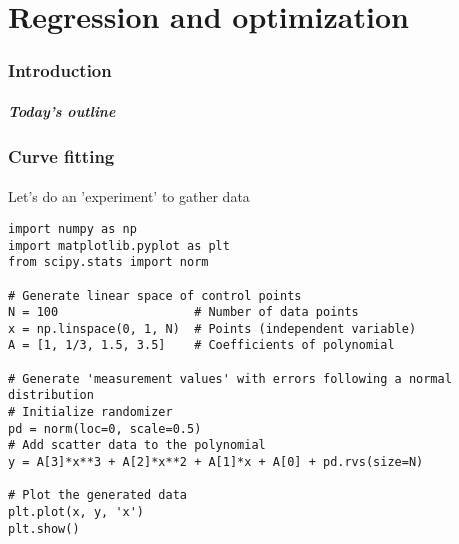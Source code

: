 \part{Regression and optimization}
\section{Introduction}
\subsection*{}
\begin{frame}[label=contents_opt]
  \frametitle{Today's outline}
\end{frame}


\section{Curve fitting}
\subsection*{}
\begin{frame}[fragile,label={slidedatacreate}]{Let's do an 'experiment' to gather data}
    \begin{lstlisting}[basicstyle=\scriptsize]
import numpy as np
import matplotlib.pyplot as plt
from scipy.stats import norm

# Generate linear space of control points
N = 100                   # Number of data points
x = np.linspace(0, 1, N)  # Points (independent variable)
A = [1, 1/3, 1.5, 3.5]    # Coefficients of polynomial

# Generate 'measurement values' with errors following a normal distribution
# Initialize randomizer
pd = norm(loc=0, scale=0.5)
# Add scatter data to the polynomial
y = A[3]*x**3 + A[2]*x**2 + A[1]*x + A[0] + pd.rvs(size=N)

# Plot the generated data
plt.plot(x, y, 'x')
plt.show()      
    \end{lstlisting}
\end{frame}

